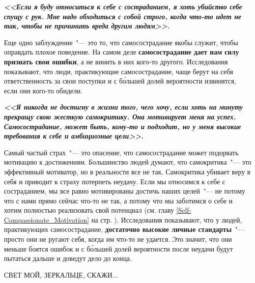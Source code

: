 \vspace{4ex}

\textbf{\textit{<<Если я буду относиться к себе с состраданием, я хоть убийство себе спущу с рук. Мне надо обходиться с собой строго, когда что-то идет не так, чтобы не причинить вреда другим людям>>.}}

\vspace{2ex}

Еще одно заблуждение~"--- это то, что самосострадание якобы служит, чтобы оправдать плохое поведение. На самом деле \textbf{самосострадание дает нам силу признать свои ошибки}, а не винить в них кого-то другого. Исследования показывают, что люди, практикующие самосострадание, чаще берут на себя ответственность за свои поступки и с б\'{о}льшей долей вероятности извинятся, если они кого-то обидели. 

\vspace{4ex}
\textbf{\textit{
<<Я никогда не достигну в жизни того, чего хочу, если хоть на минуту прекращу свою жесткую самокритику. Она мотивирует меня на успех. Самосострадание, может быть, кому-то и подходит, но у меня высокие требования к себе и амбициозные цели>>.}}

\vspace{2ex}
 
Самый частый страх~"--- это опасение, что самосострадание может подорвать мотивацию к достижениям. Большинство людей думают, что самокритика~"--- это эффективный мотиватор, но в реальности все не так. Самокритика убивает веру в себя и приводит к страху потерпеть неудачу. Если мы относимся к себе с состраданием, мы все равно мотивированы достичь наших целей~"--- не потому что с нами прямо сейчас что-то не так, а потому что мы заботимся о себе и хотим полностью реализовать свой потенциал (см. главу \ref{Self-Compassionate_Motivation} на стр. \pageref{Self-Compassionate_Motivation}). Исследования показывают, что у людей, практикующих самосострадание, \textbf{достаточно высокие личные стандарты}~"--- просто они не ругают себя, когда им что-то не удается. Это значит, что они меньше боятся ошибок и с б\'{о}льшей долей вероятности после неудачи будут пытаться дальше и доведут дело до конца. 

\vspace{4ex}

\begin{center}
	{\Large СВЕТ МОЙ, ЗЕРКАЛЬЦЕ, СКАЖИ...}	
\end{center}

\vspace{2ex}

